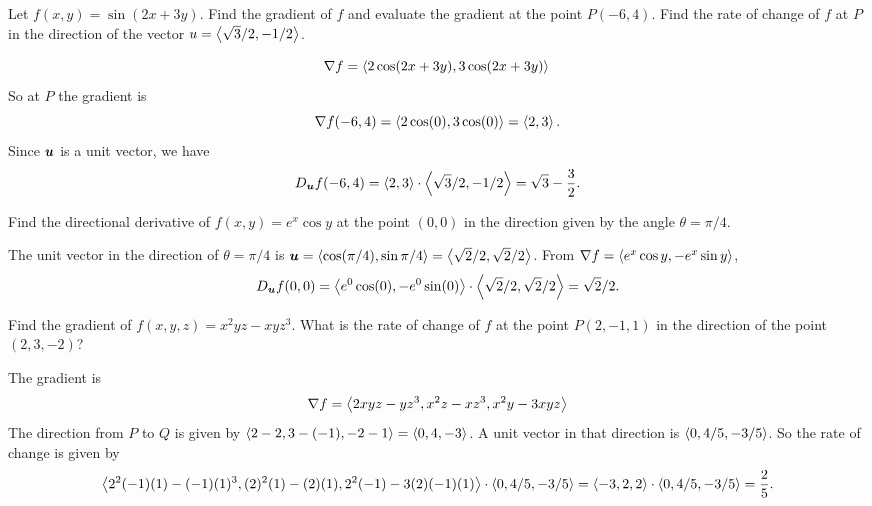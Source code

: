 \documentclass[12pt]{exam}
\begin{document}
\begin{questions}

\question Let \(f(x,y)=\sin(2x+3y)\). Find the gradient of \(f\) and evaluate the gradient at the point \(P(-6,4)\). Find the rate of change of \(f\) at \(P\) in the direction of the vector \(u=\left\langle \sqrt{3}/2,-1/2 \right\rangle\).
    \ifprintanswers
        \begin{solution}
            \[
                \nabla f = \left\langle 2\cos(2x+3y),3\cos(2x+3y) \right\rangle\\
            \]
            So at \(P\) the gradient is 
            \[
                \nabla f(-6,4)=\left\langle 2\cos(0),3\cos(0) \right\rangle = \left\langle 2,3 \right\rangle.
            \]
            Since \(\bm{u}\) is a unit vector, we have 
            \[
                D_{\bm{u}}f(-6,4) = \left\langle 2,3 \right\rangle\cdot \left\langle \sqrt{3}/2,-1/2 \right\rangle = \sqrt{3}-\frac{3}{2}.
            \]
        \end{solution}
    \else
        \vfill
    \fi

\question Find the directional derivative of \(f(x,y)=e^x\cos y\) at the point \((0,0)\) in the direction given by the angle \(\theta=\pi/4\).
    \ifprintanswers
        \begin{solution}
            The unit vector in the direction of \(\theta=\pi/4\) is \(\bm{u}=\left\langle \cos(\pi/4),\sin{\pi/4} \right\rangle=\left\langle \sqrt{2}/2,\sqrt{2}/2 \right\rangle\).
            From \(\nabla f=\left\langle e^x\cos y,-e^x\sin y \right\rangle\), 
            \[
                D_{\bm{u}}f(0,0) = \left\langle e^0\cos(0),-e^0\sin(0) \right\rangle\cdot \left\langle \sqrt{2}/2,\sqrt{2}/2 \right\rangle= \sqrt{2}/2.
            \]
            \end{solution}
    \else
        \vfill
    \fi

\question Find the gradient of \(f(x,y,z)=x^2yz-xyz^3\). What is the rate of change of \(f\) at the point \(P(2,-1,1)\) in the direction of the point \((2,3,-2)\)?
    \ifprintanswers
        \begin{solution}
            The gradient is 
            \[
                \nabla f=\left\langle 2xyz-yz^3,x^2z-xz^3,x^2y-3xyz \right\rangle
            \]
            The direction from \(P\) to \(Q\) is given by \(\left\langle 2-2,3-(-1),-2-1 \right\rangle=\left\langle 0,4,-3 \right\rangle\). A unit vector in that direction is \(\left\langle 0,4/5,-3/5 \right\rangle\).
            So the rate of change is given by
            \[
                \left\langle 2^2(-1)(1)-(-1)(1)^3,(2)^2(1)-(2)(1),2^2(-1)-3(2)(-1)(1) \right\rangle\cdot \left\langle 0,4/5,-3/5 \right\rangle = \left\langle -3,2,2 \right\rangle\cdot\left\langle 0,4/5,-3/5 \right\rangle=\frac{2}{5}.
            \]
        \end{solution}
    \else
        \vfill
        \newpage
    \fi 
\question 
\begin{parts}

\end{parts}
\end{questions}
\end{document}
